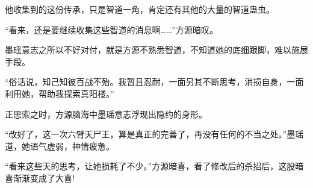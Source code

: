 \begin{this_body}
他收集到的这份传承，只是智道一角，肯定还有其他的大量的智道蛊虫。

“看来，还是要继续收集这些智道的消息啊……”方源暗叹。

墨瑶意志之所以不好对付，就是方源不熟悉智道，不知道她的底细跟脚，难以施展手段。

“俗话说，知己知彼百战不殆。我暂且忍耐，一面另其不断思考，消损自身，一面利用她，帮助我探索真阳楼。”

正思索之时，方源脑海中墨瑶意志浮现出隐约的身形。

“改好了，这一次六臂天尸王，算是真正的完善了，再没有任何的不当之处。”墨瑶道，她语气虚弱，神情疲惫。

“看来这些天的思考，让她损耗了不少。”方源暗喜，看了修改后的杀招后，这股暗喜渐渐变成了大喜!

\end{this_body}

